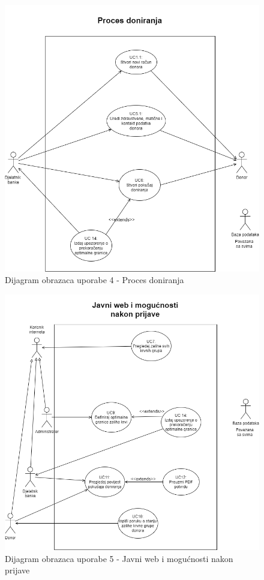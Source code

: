 				\begin{figure}[H]
    			\includegraphics[scale=0.6]{slike/UC4.png} %
    			\centering
    			\caption{Dijagram obrazaca uporabe 4 - Proces doniranja}
    			\label{fig:promjene}
    	    	\end{figure}
    	    	
				\begin{figure}[H]
    			\includegraphics[scale=0.6]{slike/UC5.png} %
    			\centering
    			\caption{Dijagram obrazaca uporabe 5 - Javni web i mogućnosti nakon prijave}
    			\label{fig:promjene}
    	    	\end{figure}
    	    	
